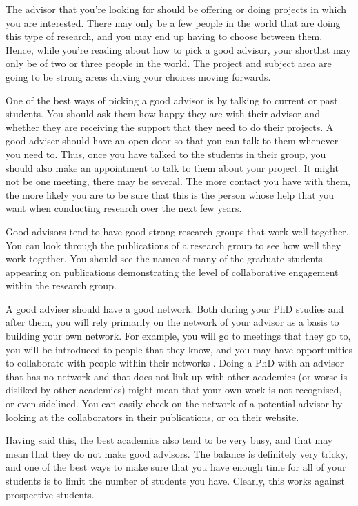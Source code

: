 \documentclass[
]{krantz}
\begin{document}
The advisor that you're looking for should be offering or doing projects in which you are interested. There may only be a few people in the world that are doing this type of research, and you may end up having to choose between them. Hence, while you're reading about how to pick a good advisor, your shortlist may only be of two or three people in the world. The project and subject area are going to be strong areas driving your choices moving forwards.

One of the best ways of picking a good advisor is by talking to current or past students. You should ask them how happy they are with their advisor and whether they are receiving the support that they need to do their projects. A good adviser should have an open door so that you can talk to them whenever you need to. Thus, once you have talked to the students in their group, you should also make an appointment to talk to them about your project. It might not be one meeting, there may be several. The more contact you have with them, the more likely you are to be sure that this is the person whose help that you want when conducting research over the next few years.

Good advisors tend to have good strong research groups that work well together. You can look through the publications of a research group to see how well they work together. You should see the names of many of the graduate students appearing on publications demonstrating the level of collaborative engagement within the research group.

A good adviser should have a good network. Both during your PhD studies and after them, you will rely primarily on the network of your advisor as a basis to building your own network. For example, you will go to meetings that they go to, you will be introduced to people that they know, and you may have opportunities to collaborate with people within their networks \citep[see][]{adams2012rise}. Doing a PhD with an advisor that has no network and that does not link up with other academics (or worse is disliked by other academics) might mean that your own work is not recognised, or even sidelined. You can easily check on the network of a potential advisor by looking at the collaborators in their publications, or on their website.

Having said this, the best academics also tend to be very busy, and that may mean that they do not make good advisors. The balance is definitely very tricky, and one of the best ways to make sure that you have enough time for all of your students is to limit the number of students you have. Clearly, this works against prospective students.
\end{document}
